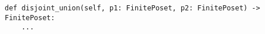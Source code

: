 \begin{verbatim}
def disjoint_union(self, p1: FinitePoset, p2: FinitePoset) -> FinitePoset:
    ...
\end{verbatim}